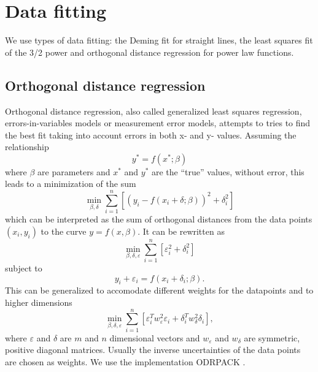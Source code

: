 \section{Data fitting}
We use types of data fitting: the Deming fit for straight lines, the least squares fit of the 3/2 power and orthogonal distance regression \cite{odrpack} for power law functions.

\subsection{Orthogonal distance regression} \label{odrpack_teorie_unc}
Orthogonal distance regression, also called generalized least squares regression, errors-in-variables models or measurement error models,  attempts to tries to find the best fit taking into account errors in both x- and y- values.
Assuming the relationship 
\begin{equation}
 y^* = f(x^*; \beta)
\end{equation}
where $\beta$ are parameters and $x^*$ and $y^*$ are the ``true'' values, without error, this leads to a minimization of the sum
\begin{equation}
 \min_{\beta, \delta} \sum_{i=1}^n \left[ \left(y_i - f(x_i+\delta; \beta)\right)^2  + \delta_i^2 \right]
\end{equation}
which can be interpreted as the sum of orthogonal distances from the data points $(x_i, y_i)$ to the curve $y = f(x,\beta)$.
It can be rewritten as 
\begin{equation}
\min_{\beta, \delta, \varepsilon} \sum_{i=1}^n \left[ \varepsilon_i^2  + \delta_i^2 \right]
 \end{equation}
subject to
\begin{equation}
 y_i + \varepsilon_i = f(x_i + \delta_i; \beta).
\end{equation}
This can be generalized to accomodate different weights for the datapoints and to higher dimensions
\begin{equation*}
 \min_{\beta, \delta, \varepsilon} \sum_{i=1}^n \left[ \varepsilon_i^T w^2_{\varepsilon} \varepsilon_i  + \delta_i^T w^2_{\delta} \delta_i \right],
\end{equation*}
where $\varepsilon$ and $\delta$ are $m$ and $n$ dimensional vectors and $w_{\varepsilon}$ and $w_{\delta}$ are symmetric, positive diagonal matrices. 
Usually the inverse uncertainties of the data points are chosen as weights.
We use the implementation ODRPACK \cite{odrpack}.

